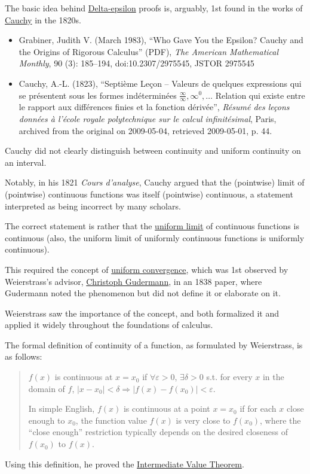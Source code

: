 \documentclass{article}
\begin{document}
%
The basic idea behind \href{https://en.wikipedia.org/wiki/(%CE%B5,_%CE%B4)-definition_of_limit}{Delta-epsilon} proofs is, arguably, 1st found in the works of \href{https://en.wikipedia.org/wiki/Augustin-Louis_Cauchy}{Cauchy} in the 1820s.
\begin{itemize}
	\item Grabiner, Judith V. (March 1983), ``Who Gave You the Epsilon? Cauchy and the Origins of Rigorous Calculus'' (PDF), \textit{The American Mathematical Monthly}, 90 (3): 185--194, doi:10.2307/2975545, JSTOR 2975545
	\item Cauchy, A.-L. (1823), ``Septième Leçon – Valeurs de quelques expressions qui se présentent sous les formes indéterminées $\frac{\infty}{\infty},\infty^0,\ldots$ Relation qui existe entre le rapport aux différences finies et la fonction dérivée'', \textit{Résumé des leçons données à l'école royale polytechnique sur le calcul infinitésimal}, Paris, archived from the original on 2009-05-04, retrieved 2009-05-01, p. 44.
\end{itemize}
Cauchy did not clearly distinguish between continuity and uniform continuity on an interval.

Notably, in his 1821 \textit{Cours d'analyse}, Cauchy argued that the (pointwise) limit of (pointwise) continuous functions was itself (pointwise) continuous, a statement interpreted as being incorrect by many scholars.

The correct statement is rather that the \href{https://en.wikipedia.org/wiki/Uniform_limit}{uniform limit} of continuous functions is continuous (also, the uniform limit of uniformly continuous functions is uniformly continuous).

This required the concept of \href{https://en.wikipedia.org/wiki/Uniform_convergence}{uniform convergence}, which was 1st observed by Weierstrass's advisor, \href{https://en.wikipedia.org/wiki/Christoph_Gudermann}{Christoph Gudermann}, in an 1838 paper, where Gudermann noted the phenomenon but did not define it or elaborate on it.

Weierstrass saw the importance of the concept, and both formalized it and applied it widely throughout the foundations of calculus.

%
The formal definition of continuity of a function, as formulated by Weierstrass, is as follows:
\begin{quotation}
	$f(x)$ is continuous at $x = x_0$ if $\forall\varepsilon > 0$, $\exists\delta > 0$ s.t. for every $x$ in the domain of $f$, $|x - x_0| < \delta\Rightarrow|f(x) - f(x_0)| < \varepsilon$.
	
	In simple English, $f(x)$ is continuous at a point $x = x_0$ if for each $x$ close enough to $x_0$, the function value $f(x)$ is very close to $f(x_0)$, where the ``close enough'' restriction typically depends on the desired closeness of $f(x_0)$ to $f(x)$.
\end{quotation}
Using this definition, he proved the \href{https://en.wikipedia.org/wiki/Intermediate_value_theorem}{Intermediate Value Theorem}.
\end{document}
